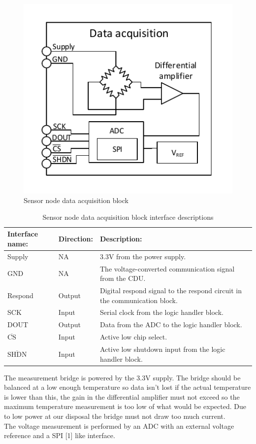 \begin{figure}[H]
	\centering
	\includegraphics[width=.5\textwidth]{billeder/data_aqcuisition_sn}
	\caption{Sensor node data acquisition block}
	\label{fig:sn_data_acquisition}
\end{figure}

\begin{table}[H]
	\centering
	\begin{tabular}{|p{3cm} |p{2cm} | p{8cm}| }
		\hline
		Interface name: 			& Direction: 	& Description: \\ \hline
		Supply						& NA			& 3.3V from the power supply. \\ \hline
		GND							& NA			& The voltage-converted communication signal from the CDU.\\ \hline
		Respond		  				& Output		& Digital respond signal to the respond circuit in the communication block. \\ \hline
		SCK							& Input			& Serial clock from the logic handler block.\\\hline
		DOUT						& Output		& Data from the ADC to the logic handler block.\\\hline
		$\overline{\text{CS}}$		& Input			& Active low chip select.\\\hline
		$\overline{\text{SHDN}}$	& Input			& Active low shutdown input from the logic handler block.\\\hline
	\end{tabular}
	\caption{Sensor node data acquisition block interface descriptions}
\end{table}

The measurement bridge is powered by the 3.3V supply. The bridge should be balanced at a low enough temperature so data isn't lost if the actual temperature is lower than this, the gain in the differential amplifier must not exceed so the maximum temperature measurement is too low of what would be expected. Due to low power at our disposal the bridge must not draw too much current.\\
The voltage measurement is performed by an ADC with an external voltage reference and a SPI [1] like interface.

